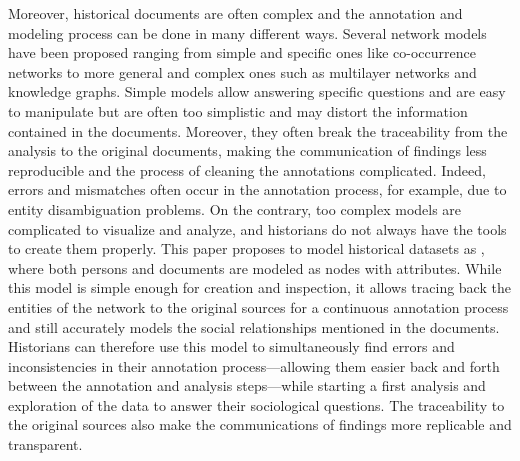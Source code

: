 Moreover, historical documents are often complex and the annotation and modeling process can be done in many different ways.
Several network models have been proposed ranging from simple and specific ones like co-occurrence networks to more general and complex ones such as multilayer networks and knowledge graphs.
Simple models allow answering specific questions and are easy to manipulate but are often too simplistic and may distort the information contained in the documents.
Moreover, they often break the traceability from the analysis to the original documents, making the communication of findings less reproducible and the process of cleaning the annotations complicated.
Indeed, errors and mismatches often occur in the annotation process, for example, due to entity disambiguation problems.
On the contrary, too complex models are complicated to visualize and analyze, and historians do not always have the tools to create them properly.
This paper proposes to model historical datasets as \modelplural, where both persons and documents are modeled as nodes with attributes.
While this model is simple enough for creation and inspection, it allows tracing back the entities of the network to the original sources for a continuous annotation process and still accurately models the social relationships mentioned in the documents.
Historians can therefore use this model to simultaneously find errors and inconsistencies in their annotation process---allowing them easier back and forth between the annotation and analysis steps---while starting a first analysis and exploration of the data to answer their sociological questions.
The traceability to the original sources also make the communications of findings more replicable and transparent.




